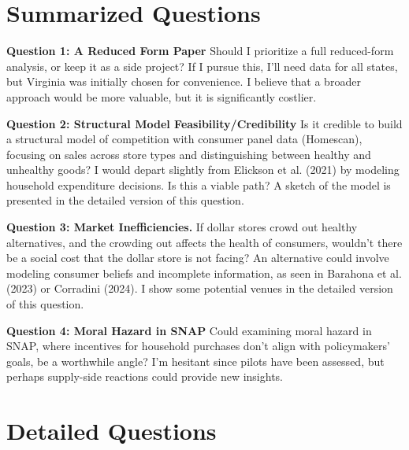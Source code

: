 \documentclass[11.5pt]{article}
\title{}
\author{Alejandro Herrera-Caicedo }
\date{September 2024}
\begin{document}
\maketitle

\section{Summarized Questions}


\textbf{Question 1: A Reduced Form Paper}
Should I prioritize a full reduced-form analysis, or keep it as a side project? If I pursue this, I’ll need data for all states, but Virginia was initially chosen for convenience. I believe that a broader approach would be more valuable, but it is significantly costlier. 

\textbf{Question 2: Structural Model Feasibility/Credibility}
Is it credible to build a structural model of competition with consumer panel data (Homescan), focusing on sales across store types and distinguishing between healthy and unhealthy goods? I would depart slightly from Elickson et al. (2021) by modeling household expenditure decisions. Is this a viable path? A sketch of the model is presented in the detailed version of this question.

\textbf{Question 3: Market Inefficiencies.} If dollar stores crowd out healthy alternatives, and the crowding out affects the health of consumers, wouldn't there be a social cost that the dollar store is not facing? An alternative could involve modeling consumer beliefs and incomplete information, as seen in Barahona et al. (2023) or Corradini (2024). I show some potential venues in the detailed version of this question. 

\textbf{Question 4: Moral Hazard in SNAP}
Could examining moral hazard in SNAP, where incentives for household purchases don’t align with policymakers’ goals, be a worthwhile angle? I’m hesitant since pilots have been assessed, but perhaps supply-side reactions could provide new insights.



\section{Detailed Questions}
\end{document}
